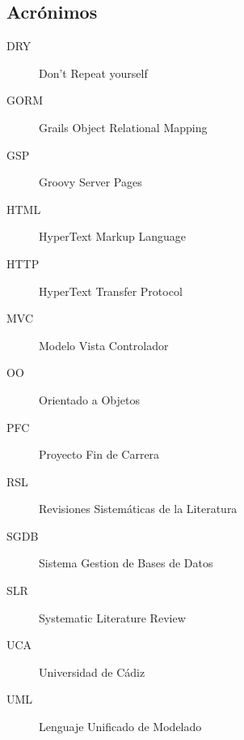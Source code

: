 \subsection{Acrónimos}
\begin{description}
	\item [DRY]	Don't Repeat yourself
	\item [GORM]	Grails Object Relational Mapping
	\item [GSP]	Groovy Server Pages
	\item [HTML]	HyperText Markup Language
	\item [HTTP]	HyperText Transfer Protocol
	\item [MVC]	Modelo Vista Controlador
	\item [OO]	Orientado a Objetos
	\item [PFC]	Proyecto Fin de Carrera
	\item [RSL]	Revisiones Sistemáticas de la Literatura
	\item [SGDB]	Sistema Gestion de Bases de Datos
	\item [SLR]	Systematic Literature Review
	\item [UCA]	Universidad de Cádiz
	\item [UML]	Lenguaje Unificado de Modelado
\end{description}

